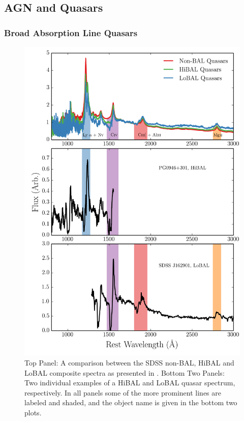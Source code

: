 \subsection{AGN and Quasars}
\label{sec:agn_winds}

\subsubsection{Broad Absorption Line Quasars}
\label{sec:balqsos}

\begin{figure}
\centering
\includegraphics[width=1.0\textwidth]{figures/02-outflows/bal_spectra.png}
\caption
{
Top Panel: A comparison between the SDSS non-BAL, HiBAL and LoBAL
composite spectra as presented in \cite{reichard2003}. 
Bottom Two Panels: Two individual examples of a HiBAL and LoBAL quasar
spectrum, respectively. In all panels some of the more prominent
lines are labeled and shaded, and the object name is given in 
the bottom two plots.
} 
\label{fig:bals}
\end{figure}

